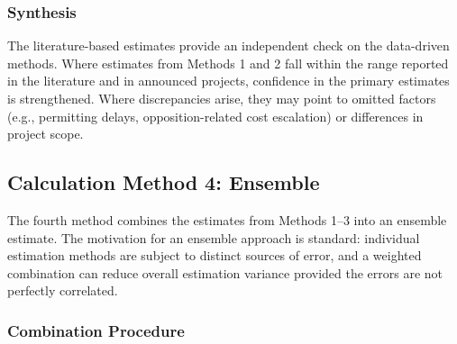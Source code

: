 \documentclass[12pt]{article}
\begin{document}
\subsubsection{Synthesis}

The literature-based estimates provide an independent check on the data-driven methods. Where estimates from Methods 1 and 2 fall within the range reported in the literature and in announced projects, confidence in the primary estimates is strengthened. Where discrepancies arise, they may point to omitted factors (e.g., permitting delays, opposition-related cost escalation) or differences in project scope. %

\subsection{Calculation Method 4: Ensemble}
\label{sec:ensemble}

The fourth method combines the estimates from Methods 1--3 into an ensemble estimate. The motivation for an ensemble approach is standard: individual estimation methods are subject to distinct sources of error, and a weighted combination can reduce overall estimation variance provided the errors are not perfectly correlated.

\subsubsection{Combination Procedure}




\end{document}
